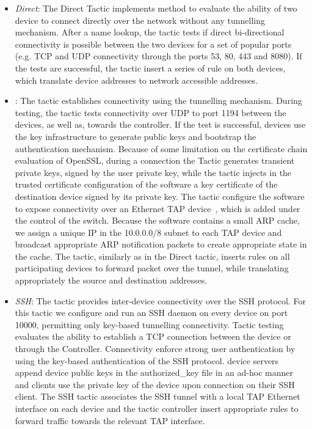 \begin{itemize}

  \item \emph{Direct}: The Direct Tactic implements method to evaluate the
        ability of  two device to connect directly over the network without any
        tunnelling mechanism. After a name lookup, the tactic tests if direct
        bi-directional connectivity is possible between the two devices for a
        set of popular ports (e.g. TCP and UDP connectivity through the ports
        53, 80, 443 and 8080). If the tests are successful, the tactic insert a
        series of \of rule on both devices, which translate \signpost device
        addresses to network accessible addresses. 

  \item \emph{\openvpn}: The \openvpn tactic establishes connectivity using the
    \openvpn tunnelling mechanism. During testing, the tactic tests connectivity
    over UDP to port 1194 between the devices, as well as, towards the
    controller. If the test is successful, \signpost devices  use the \signpost
    key infrastructure to generate public keys and bootstrap the \openvpn
    authentication mechanism.  Because of some limitation on the certificate
    chain evaluation of OpenSSL, during a connection the Tactic generates
    transient private keys, signed by the user private key, while the tactic
    injects in the trusted certificate configuration of the \openvpn software a
    key certificate of the destination device signed by its private key.  The
    tactic configure the \openvpn software to expose connectivity over an
    Ethernet TAP device~\cite{tuntap}, which is added under the control of the
    \of switch.  Because the \openvpn software contains a small ARP cache, we
    assign a unique IP in the 10.0.0.0/8 subnet to each TAP device and broadcast
    appropriate ARP notification packets to create appropriate state in the
    cache.  The tactic, similarly as in the Direct tactic, inserts \of rules on
    all participating devices to forward packet over the \openvpn tunnel, while
    translating appropriately the source and destination addresses. 

  \item \emph{SSH}:  The tactic provides inter-device connectivity over the SSH
    protocol. For this tactic we configure and run an SSH daemon on every
    \signpost device on port 10000, permitting only key-based tunnelling
    connectivity.  Tactic testing evaluates the ability to establish a TCP
    connection between the device or through the Controller.  Connectivity
    enforce strong user authentication by using the key-based authentication of
    the SSH protocol. \signpost device servers append device public keys in the
    authorized\_key file in an ad-hoc manner and clients use the private key of
    the device upon connection on their SSH client.  The SSH tactic associates
    the SSH tunnel with a local TAP Ethernet interface on each device and the
    tactic controller insert appropriate \of rules to forward traffic towards
    the relevant TAP interface.


\end{itemize}

